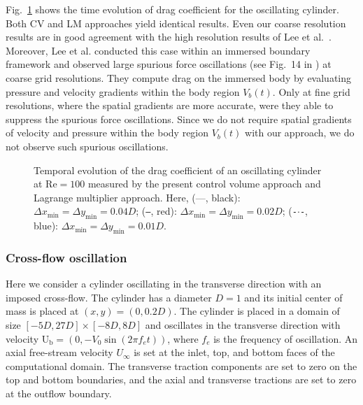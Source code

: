 \documentclass[review]{elsarticle}
\renewcommand{\vec}[1]{\bm{\mathrm{#1}}}
\def \U{\vec{U}}
\def \Vbt{V_b(t)}
\def \U{\vec{U}}
\def \Ub{\U_{\text{b}}}
\def \Re{\text{Re}}
\def \dx{\Delta x}
\def \dy{\Delta y}
\def \dx{\Delta x}
\begin{document}
Fig.~\ref{fig_oscillating_cylinder_inline} shows the time evolution of drag coefficient for the
oscillating cylinder. Both CV and LM approaches yield identical results. Even our coarse resolution
results are in good agreement with the high resolution results of Lee et al.~\cite{Lee11}. Moreover, Lee et al. 
conducted this case within an immersed boundary framework and observed large spurious force 
oscillations (see Fig.~14 in \cite{Lee11}) at coarse grid resolutions. They compute drag on the immersed body 
by evaluating pressure and velocity gradients within the body region $\Vbt$. Only at fine grid resolutions,
where the spatial gradients are more accurate, were they able to suppress the spurious force oscillations. 
Since we do not require spatial gradients of velocity and pressure within the body region $\Vbt$ with our approach, we 
do not observe such spurious oscillations.

\begin{figure}[H]
  \centering
  \caption{
   Temporal evolution of the drag coefficient of an oscillating cylinder at $\Re = 100$ measured by the 
    present control volume approach and
     Lagrange multiplier approach.
    Here, (---, black): $\dx_\textrm{min} = \dy_\textrm{min} = 0.04D$;
    (\texttt{---}, red): $\dx_\textrm{min} = \dy_\textrm{min} = 0.02D$;
    (\texttt{-}$\cdot$\texttt{-}, blue): $\dx_\textrm{min} = \dy_\textrm{min} = 0.01D$.}
  \label{fig_oscillating_cylinder_inline}
\end{figure}



\subsubsection{Cross-flow oscillation}
Here we consider a cylinder oscillating in the transverse direction with an imposed
cross-flow. The cylinder has a diameter $D = 1$ and its initial center of mass
is placed at $(x,y) = (0,0.2D)$. The cylinder is placed in a domain of size $[-5D,27D]\times[-8D,8D]$
and oscillates in the transverse direction with velocity $\Ub = \left(0, -V_0 \sin(2 \pi f_e t) \right)$,
where $f_e$ is the frequency of oscillation. An axial free-stream velocity $U_{\infty}$ is set at
the inlet, top, and bottom faces of the computational domain. The transverse traction components
are set to zero on the top and bottom boundaries, and the axial and transverse tractions are set to zero
at the outflow boundary.
\end{document}
